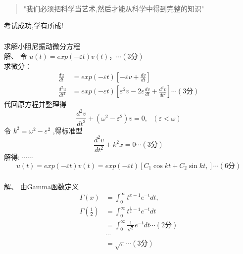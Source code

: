\begin{frame} 
	\begin{quotation}
		"我们必须把科学当艺术,然后才能从科学中得到完整的知识"  \\
	\end{quotation}
\end{frame}

\begin{frame}[plain]
    \Background[2] 
	\begin{center}
		{\huge \color{deepred} 考试成功,学有所成! }
	\end{center}
    \addtocounter{framenumber}{-1} 
\end{frame}

\begin{frame} 
\frametitle{}
求解小阻尼振动微分方程 \\ 

\alert{解、} 令 $\displaystyle  u(t)= exp(-\varepsilon t) v(t) ， \cdots  (\text{3分})$ \\ 
求微分：	
	\begin{align*}
		\frac{d u}{d t } & =exp(-\varepsilon t) [-\varepsilon v +\frac{d v}{dt}]\\
		\frac{d^2 u}{d t^2 } & =exp(-\varepsilon t) [\varepsilon ^2 v -2\varepsilon \frac{d v}{dt}+ \frac{d^2 v}{dt^2} ] \cdots  (\text{3分})  
	\end{align*} 
	代回原方程并整理得
	\begin{equation*}
		\frac{d^2 v}{d t^2} +(\omega ^2 - \varepsilon ^2) v = 0,  ~~~ (\varepsilon < \omega)   
	\end{equation*}
   令  $k^2 = \omega ^2 - \varepsilon ^2$ ,得标准型
   \[\dfrac{d ^2 v}{d t^2} +k ^2 x = 0 \cdots  (\text{3分}) \]   
   解得:  $\cdots \cdots $
   \begin{equation*}
    u(t)= exp(-\varepsilon t) v(t) =exp(-\varepsilon t) [ C_1 \cos k t +C_2 \sin k t,  ] \cdots (\text{6分}) 
\end{equation*}	
\end{frame}

\begin{frame} 
\frametitle{}
\alert{解、} 由Gamma函数定义
\[
	\begin{aligned}
		 \Gamma(x)&=\int_{0}^{\infty} t^{x-1} e^{-t} dt,    \\
		 \Gamma(\frac{1}{2})&=\int_{0}^{\infty} t^{\frac{1}{2}-1} e^{-t} dt\\
		 &=\int_{0}^{\infty} \frac{1}{\sqrt{t}} e^{-t} dt  \cdots  (\text{2分})\\
         &\cdots \\
         &=\sqrt{\pi}   \cdots  (\text{3分})
	\end{aligned}	
	\]
\end{frame}

